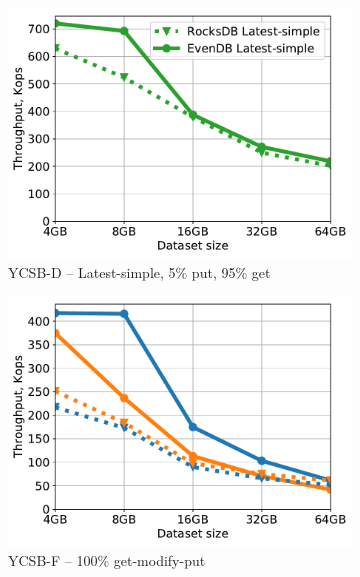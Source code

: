 \begin{figure}[tb]
\begin{subfigure}{0.33\linewidth}
\includegraphics[width=\textwidth]{figs/Workload_D_line.pdf}
\caption{YCSB-D -- Latest-simple, 5\% put, 95\% get}
\label{fig:throughput:d}
\end{subfigure}
\begin{subfigure}{0.33\linewidth}
\includegraphics[width=\textwidth]{figs/Workload_F_line.pdf}
\caption{YCSB-F -- 100\% get-modify-put}
\label{fig:throughput:f}
\end{subfigure}
\hspace{70pt}
\begin{subfigure}{0.33\linewidth}

\end{subfigure}
\end{figure}
